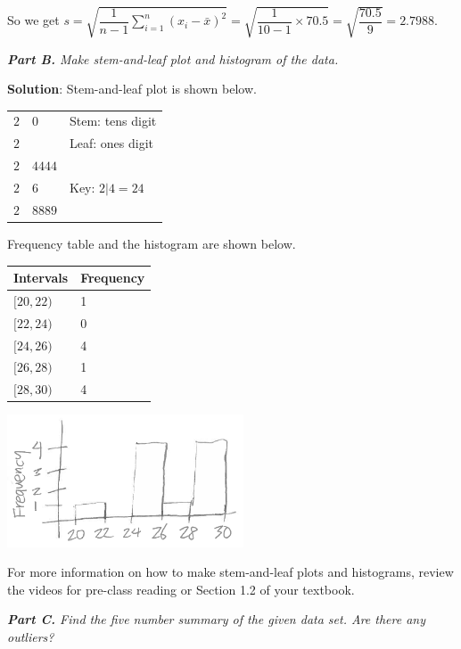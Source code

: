\documentclass[12pt]{article}
\begin{document}
So we get $s = \sqrt{\dfrac{1}{n-1} \sum_{i=1}^{n} (x_i-\bar{x})^2} = \sqrt{ \dfrac{1}{10-1} \times 70.5} = \sqrt{\dfrac{70.5}{9}} = 2.7988$.

\pagebreak

\textit{\textbf{Part B.} Make stem-and-leaf plot and histogram of the data.}

\textbf{Solution}: Stem-and-leaf plot is shown below.

\begin{tabular}{l|ll}
	$2$ & $0$       & \hspace{1 cm} Stem: tens digit\\
	$2$ &    		& \hspace{1 cm} Leaf: ones digit\\
	$2$ & $4444$  	& \\
	$2$ & $6$		 & \hspace{1 cm} Key: $2|4=24$\\
	$2$ & $8889$  &
\end{tabular}
	
Frequency table and the histogram are shown below.

\begin{minipage}{0.49\textwidth}
	\def\arraystretch{1.2}
	\begin{tabular}{l|l}
		Intervals & Frequency  \\ \hline
		$[20,22)$ & 1 \\
		$[22,24)$ & 0 \\
		$[24,26)$ & 4 \\
		$[26,28)$ & 1 \\
		$[28,30)$ & 4
	\end{tabular}
\end{minipage}
\begin{minipage}{0.49\textwidth}
	\includegraphics[width=7cm]{Figures/fig7.png}
\end{minipage}

For more information on how to make stem-and-leaf plots and histograms, review the videos for pre-class reading or Section 1.2 of your textbook.

\textit{\textbf{Part C.} Find the five number summary of the given data set. Are there any outliers?}
\end{document}
